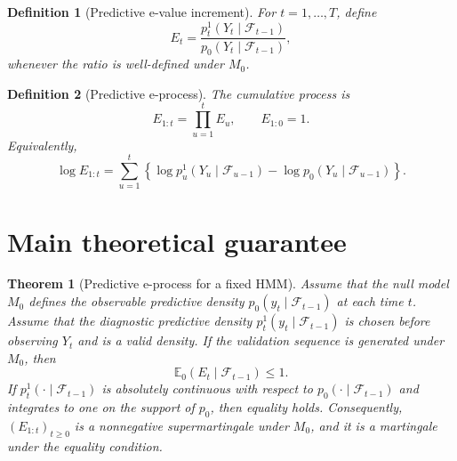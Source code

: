 \documentclass[11pt]{article}
\newtheorem{theorem}{Theorem}
\newtheorem{definition}{Definition}
\begin{document}
\begin{definition}[Predictive e-value increment]
For $t=1,\ldots,T$, define
\begin{equation}
\label{eq:increment}
E_t =
\frac{p_t^1(Y_t \mid \mathcal F_{t-1})}
{p_0(Y_t \mid \mathcal F_{t-1})},
\end{equation}
whenever the ratio is well-defined under $M_0$.
\end{definition}

\begin{definition}[Predictive e-process]
The cumulative process is
\begin{equation}
\label{eq:eprocess}
E_{1:t} = \prod_{u=1}^t E_u,
\qquad E_{1:0}=1.
\end{equation}
Equivalently,
\begin{equation}
\log E_{1:t}
=
\sum_{u=1}^t
\left\{
\log p_u^1(Y_u \mid \mathcal F_{u-1})
-
\log p_0(Y_u \mid \mathcal F_{u-1})
\right\}.
\end{equation}
\end{definition}

\section{Main theoretical guarantee}

\begin{theorem}[Predictive e-process for a fixed HMM]
\label{thm:predictive_eprocess}
Assume that the null model $M_0$ defines the observable predictive density $p_0(y_t \mid \mathcal F_{t-1})$ at each time $t$. Assume that the diagnostic predictive density $p_t^1(y_t \mid \mathcal F_{t-1})$ is chosen before observing $Y_t$ and is a valid density. If the validation sequence is generated under $M_0$, then
\begin{equation}
\mathbb E_0(E_t \mid \mathcal F_{t-1}) \leq 1.
\end{equation}
If $p_t^1(\cdot \mid \mathcal F_{t-1})$ is absolutely continuous with respect to $p_0(\cdot \mid \mathcal F_{t-1})$ and integrates to one on the support of $p_0$, then equality holds. Consequently, $(E_{1:t})_{t\geq0}$ is a nonnegative supermartingale under $M_0$, and it is a martingale under the equality condition.
\end{theorem}
\end{document}
